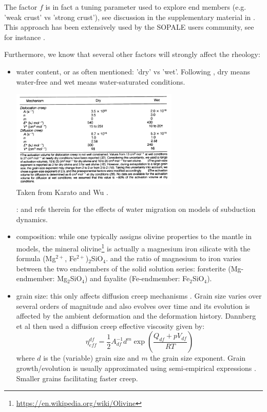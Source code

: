 The factor $f$ is in fact a tuning parameter used to explore end members (e.g. 'weak crust' 
vs 'strong crust'), see discussion in the supplementary material in \cite{hube11}. 
This approach has been extensively used by the SOPALE users community, see 
for instance \cite{wabj08,wabj08b,wabj08c,grpy12}.



Furthermore, we know that several other factors will strongly affect the rheology:
\begin{itemize}
\item water content, or as often mentioned: 'dry' vs 'wet'. Following \cite{kawu93}, 
dry means water-free and wet means water-saturated conditions.
\begin{center}
\includegraphics[width=8cm]{images/rheology/kawu93}\\
{\scriptsize Taken from Karato and Wu \cite{kawu93}.}
\end{center}
\Literature: \cite{qubu14} and refs therein for the effects of water
migration on models of subduction dynamics.

\item composition: while one typically assigns olivine properties to the mantle in models, 
the mineral olivine\footnote{\url{https://en.wikipedia.org/wiki/Olivine}} 
is actually a magnesium iron silicate with the formula (Mg$^{2+}$, Fe$^{2+}$)$_2$SiO$_4$.
and the ratio of magnesium to iron varies between the two endmembers of the solid solution series: 
forsterite (Mg-endmember: Mg$_2$SiO$_4$) and fayalite (Fe-endmember: Fe$_2$SiO$_4$).

\item grain size: this only affects diffusion creep mechanisms \cite{kawu93}. 
Grain size varies over several orders of magnitude and also evolves over time and 
its evolution is affected by the ambient deformation and the deformation history.
Dannberg et al \cite{daef17} then used a diffusion creep effective viscosity 
given by:
\[
\eta_{eff}^{df} = \frac{1}{2} A_{df}^{-1} d^m \exp \left( \frac{Q_{df}+pV_{df}}{RT}  \right)
\] 
where $d$ is the (variable) grain size and $m$ the grain size exponent. Grain growth/evolution 
is usually approximated using semi-empirical expressions \cite[section~2.2]{daef17}.
Smaller grains facilitating faster creep.


\end{itemize}
